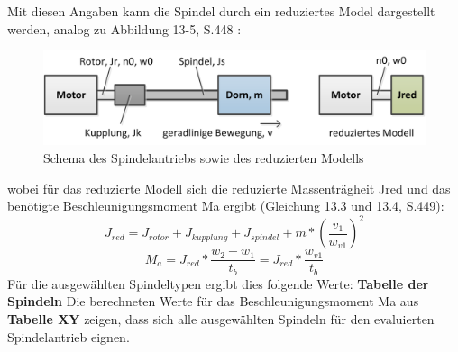 Mit diesen Angaben kann die Spindel durch ein reduziertes Model dargestellt werden, analog zu Abbildung 13-5, S.448 \cite{roloffmatek}:
 	\begin{figure}[H]
 	\includegraphics[width=1\textwidth]{Illustrationen/6-Umsetzung/red_modell.png}
 	\caption{Schema des Spindelantriebs sowie des reduzierten Modells}
 	\label{fig:red_modell}
	\end{figure}
wobei für das reduzierte Modell sich die reduzierte Massenträgheit Jred und das benötigte Beschleunigungsmoment Ma ergibt (Gleichung 13.3 und 13.4, S.449):
\begin{equation}
J_{red}=J_{rotor}+J_{kupplung}+J_{spindel}+m*(\frac{v_{1}}{w_{v1}})^{2}
\end{equation}
\begin{equation}
M_{a}=J_{red}*\frac{w_{2}-w_{1}}{t_{b}}=J_{red}*\frac{w_{v1}}{t_{b}}
\end{equation}
Für die ausgewählten Spindeltypen ergibt dies folgende Werte:
\newline
\textbf{Tabelle der Spindeln}
Die berechneten Werte für das Beschleunigungsmoment Ma aus \textbf{Tabelle XY} zeigen, dass sich alle ausgewählten Spindeln für den evaluierten Spindelantrieb eignen.
\newline
\newline

